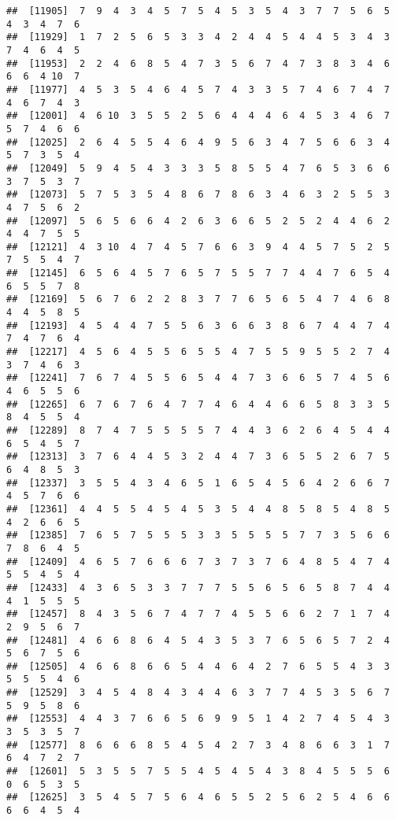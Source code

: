 \documentclass[
]{book}
\begin{document}
\begin{verbatim}
##  [11905]  7  9  4  3  4  5  7  5  4  5  3  5  4  3  7  7  5  6  5  4  3  4  7  6
##  [11929]  1  7  2  5  6  5  3  3  4  2  4  4  5  4  4  5  3  4  3  7  4  6  4  5
##  [11953]  2  2  4  6  8  5  4  7  3  5  6  7  4  7  3  8  3  4  6  6  6  4 10  7
##  [11977]  4  5  3  5  4  6  4  5  7  4  3  3  5  7  4  6  7  4  7  4  6  7  4  3
##  [12001]  4  6 10  3  5  5  2  5  6  4  4  4  6  4  5  3  4  6  7  5  7  4  6  6
##  [12025]  2  6  4  5  5  4  6  4  9  5  6  3  4  7  5  6  6  3  4  5  7  3  5  4
##  [12049]  5  9  4  5  4  3  3  3  5  8  5  5  4  7  6  5  3  6  6  3  7  5  3  7
##  [12073]  5  7  5  3  5  4  8  6  7  8  6  3  4  6  3  2  5  5  3  4  7  5  6  2
##  [12097]  5  6  5  6  6  4  2  6  3  6  6  5  2  5  2  4  4  6  2  4  4  7  5  5
##  [12121]  4  3 10  4  7  4  5  7  6  6  3  9  4  4  5  7  5  2  5  7  5  5  4  7
##  [12145]  6  5  6  4  5  7  6  5  7  5  5  7  7  4  4  7  6  5  4  6  5  5  7  8
##  [12169]  5  6  7  6  2  2  8  3  7  7  6  5  6  5  4  7  4  6  8  4  4  5  8  5
##  [12193]  4  5  4  4  7  5  5  6  3  6  6  3  8  6  7  4  4  7  4  7  4  7  6  4
##  [12217]  4  5  6  4  5  5  6  5  5  4  7  5  5  9  5  5  2  7  4  3  7  4  6  3
##  [12241]  7  6  7  4  5  5  6  5  4  4  7  3  6  6  5  7  4  5  6  4  6  5  5  6
##  [12265]  6  7  6  7  6  4  7  7  4  6  4  4  6  6  5  8  3  3  5  8  4  5  5  4
##  [12289]  8  7  4  7  5  5  5  5  7  4  4  3  6  2  6  4  5  4  4  6  5  4  5  7
##  [12313]  3  7  6  4  4  5  3  2  4  4  7  3  6  5  5  2  6  7  5  6  4  8  5  3
##  [12337]  3  5  5  4  3  4  6  5  1  6  5  4  5  6  4  2  6  6  7  4  5  7  6  6
##  [12361]  4  4  5  5  4  5  4  5  3  5  4  4  8  5  8  5  4  8  5  4  2  6  6  5
##  [12385]  7  6  5  7  5  5  5  3  3  5  5  5  5  7  7  3  5  6  6  7  8  6  4  5
##  [12409]  4  6  5  7  6  6  6  7  3  7  3  7  6  4  8  5  4  7  4  5  5  4  5  4
##  [12433]  4  3  6  5  3  3  7  7  7  5  5  6  5  6  5  8  7  4  4  4  1  5  5  5
##  [12457]  8  4  3  5  6  7  4  7  7  4  5  5  6  6  2  7  1  7  4  2  9  5  6  7
##  [12481]  4  6  6  8  6  4  5  4  3  5  3  7  6  5  6  5  7  2  4  5  6  7  5  6
##  [12505]  4  6  6  8  6  6  5  4  4  6  4  2  7  6  5  5  4  3  3  5  5  5  4  6
##  [12529]  3  4  5  4  8  4  3  4  4  6  3  7  7  4  5  3  5  6  7  5  9  5  8  6
##  [12553]  4  4  3  7  6  6  5  6  9  9  5  1  4  2  7  4  5  4  3  3  5  3  5  7
##  [12577]  8  6  6  6  8  5  4  5  4  2  7  3  4  8  6  6  3  1  7  6  4  7  2  7
##  [12601]  5  3  5  5  7  5  5  4  5  4  5  4  3  8  4  5  5  5  6  0  6  5  3  5
##  [12625]  3  5  4  5  7  5  6  4  6  5  5  2  5  6  2  5  4  6  6  6  6  4  5  4

\end{verbatim}
\end{document}
